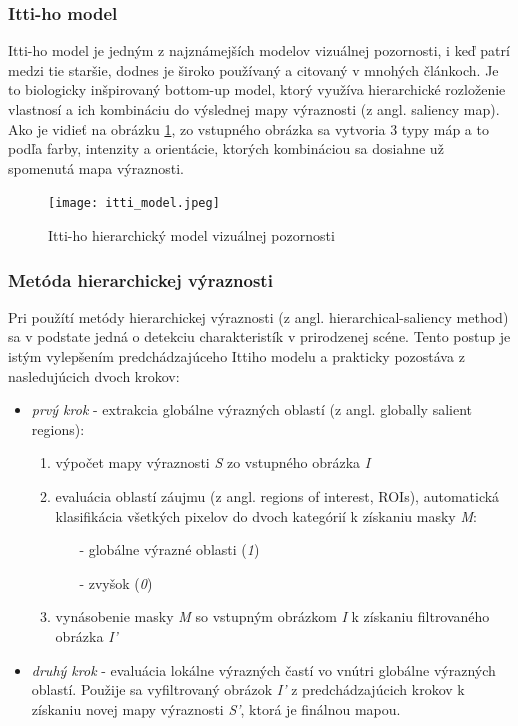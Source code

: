 \subsubsection{Itti-ho model}

Itti-ho model\cite{itti} je jedným z najznámejších modelov vizuálnej pozornosti, i keď patrí medzi tie staršie, dodnes je široko používaný a citovaný v mnohých článkoch. Je to biologicky inšpirovaný bottom-up model, ktorý využíva hierarchické rozloženie vlastnosí a ich kombináciu do výslednej mapy výraznosti (z angl. saliency map). Ako je vidieť na obrázku \ref{itti_image}, zo vstupného obrázka sa vytvoria 3 typy máp a to podľa farby, intenzity a orientácie, ktorých kombináciou sa dosiahne už spomenutá mapa výraznosti. 

\begin{figure}[H]
	\begin{center}
		\texttt{[image: itti\_model.jpeg]}
	\end{center}
	\caption[Itti-ho hierarchický model vizuálnej pozornosti]{Itti-ho hierarchický model vizuálnej pozornosti\cite{itti}\label{itti_image}}
\end{figure}

\subsubsection{Metóda hierarchickej výraznosti}

Pri použítí metódy hierarchickej výraznosti (z angl. hierarchical-saliency method\cite{gao2013hierarchical}) sa v podstate jedná o detekciu charakteristík v prirodzenej scéne. Tento postup je istým vylepšením predchádzajúceho Ittiho modelu a prakticky pozostáva z nasledujúcich dvoch krokov:

\begin{itemize}
	\item \textit{prvý krok} - extrakcia globálne výrazných oblastí (z angl. globally salient
	regions):
		\begin{enumerate}
			\item výpočet mapy výraznosti \textit{S} zo vstupného obrázka \textit{I}
			\item evaluácia oblastí záujmu (z angl. regions of interest, ROIs), automatická
			klasifikácia všetkých pixelov do dvoch kategórií k získaniu masky \textit{M}:
			\begin{itemize}
				\item[-] globálne výrazné oblasti (\textit{1})
				\item[-] zvyšok (\textit{0})
			\end{itemize}
			\item vynásobenie masky \textit{M} so vstupným obrázkom \textit{I} k získaniu filtrovaného
			obrázka \textit{I'}
		\end{enumerate}
	\item \textit{druhý krok} - evaluácia lokálne výrazných častí vo vnútri globálne výrazných
	oblastí. Použije sa vyfiltrovaný obrázok \textit{I'} z predchádzajúcich krokov k získaniu novej mapy výraznosti \textit{S'}, ktorá je finálnou mapou.
\end{itemize}
	
